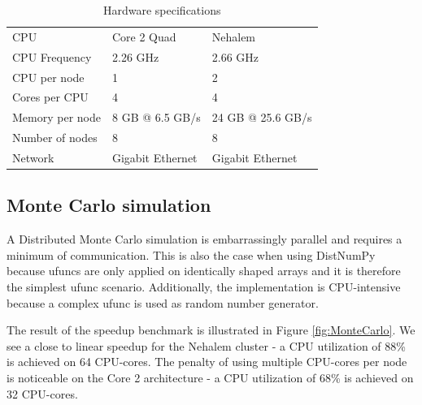 \documentclass{sigplanconf}
\begin{document}
\begin{table}
\caption{Hardware specifications}
\centering
\begin{tabular}{|lll|}
\hline
CPU & Core 2 Quad & Nehalem\\
CPU Frequency & 2.26 GHz & 2.66 GHz\\
CPU per node & 1 & 2\\
Cores per CPU & 4 & 4\\
Memory per node & 8 GB @ 6.5 GB/s & 24 GB @ 25.6 GB/s\\
Number of nodes & 8 & 8\\
Network & Gigabit Ethernet & Gigabit Ethernet\\
\hline
\end{tabular}

\label{tab:specs}
\end{table}


\subsection{Monte Carlo simulation}
A Distributed Monte Carlo simulation is embarrassingly parallel and requires a minimum of communication.  This is also the case when using DistNumPy because ufuncs are only applied on identically shaped arrays and it is therefore the simplest ufunc scenario. Additionally, the implementation is CPU-intensive because a complex ufunc is used as random number generator. 

The result of the speedup benchmark is illustrated in Figure \ref{fig:MonteCarlo}. We see a close to linear speedup for the Nehalem cluster - a CPU utilization of 88\% is achieved on 64 CPU-cores. The penalty of using multiple CPU-cores per node is noticeable on the Core 2 architecture - a CPU utilization of 68\% is achieved on 32 CPU-cores.
\end{document}

